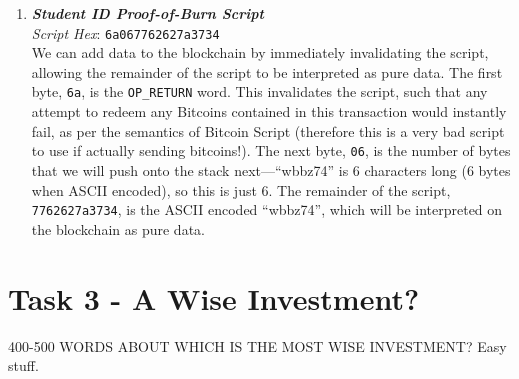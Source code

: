 \documentclass[11pt]{article}
\begin{document}
\begin{enumerate}
\item \textbf{\textit{Student ID Proof-of-Burn Script}}\\
\textit{Script Hex}: \texttt{6a067762627a3734}\\
We can add data to the blockchain by immediately invalidating the script, allowing the remainder of the script to be interpreted as pure data.
The first byte, \texttt{6a}, is the \texttt{OP\_RETURN} word. This invalidates the script, such that any attempt to redeem any Bitcoins contained in this transaction would instantly fail, as per the semantics of Bitcoin Script (therefore this is a very bad script to use if actually sending bitcoins!).
The next byte, \texttt{06}, is the number of bytes that we will push onto the stack next---``wbbz74'' is 6 characters long (6 bytes when ASCII encoded), so this is just 6. 
The remainder of the script, \texttt{7762627a3734}, is the ASCII encoded ``wbbz74'', which will be interpreted on the blockchain as pure data.

\end{enumerate}

\section*{Task 3 - A Wise Investment?}


400-500 WORDS ABOUT WHICH IS THE MOST WISE INVESTMENT? Easy stuff.
\end{document}

